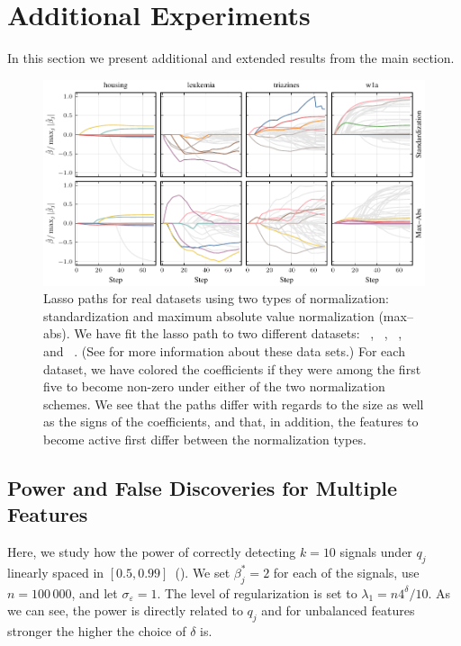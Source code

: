 \section{Additional Experiments}\label{sec:additional-results}

In this section we present additional and extended results from the main section.

\begin{figure}[hbpt]
  \centering
  \includegraphics[]{plots/realdata_paths.pdf}
  \caption{%
    Lasso paths for real datasets using two types of normalization:
    standardization and maximum absolute value normalization (max--abs). We have fit
    the lasso path to two different datasets:
    ~\citep{harrison1978}, ~\citep{golub1999},
    ~\citep{king}, and ~\citep{platt1998}. (See 
    for more information about these data sets.) For each
    dataset, we have colored the coefficients if they were among the first five
    to become non-zero under either of the two normalization schemes. We see
    that the paths differ with regards to the size as well as the signs of the
    coefficients, and that, in addition, the features to become active first
    differ between the normalization types.
  }
  \label{fig:realdata-paths-full}
\end{figure}

\subsection{Power and False Discoveries for Multiple Features}%
\label{sec:power-fdr-multiple}

Here, we study how the power of correctly detecting \(k=10\) signals under \(q_j\) linearly
spaced in \([0.5, 0.99]\)~(). We set \(\beta^*_j = 2\) for each of
the signals, use \(n = 100\,000\), and let \(\sigma_\varepsilon = 1\). The level of
regularization is set to \(\lambda_1 = n 4^\delta/10\). As we can see, the power is
directly related to \(q_j\) and for unbalanced features stronger the higher the choice of
\(\delta\) is.

